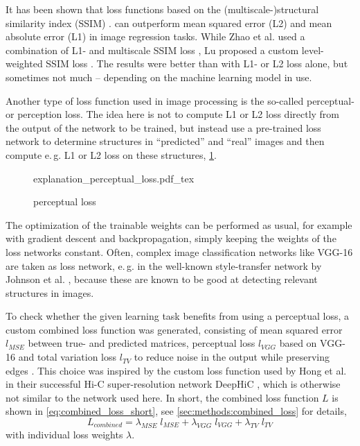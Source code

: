 It has been shown that loss functions based on the (multiscale-)structural similarity index (SSIM) \cite{Wang2003}. 
can outperform mean squared error (L2) and mean absolute error (L1) in image regression tasks.
While Zhao et al. used a combination of L1- and multiscale SSIM loss \cite{Zhao2017},
Lu proposed a custom level-weighted SSIM loss \cite{Lu2019}.
The results were better than with L1- or L2 loss alone, but sometimes not much -- depending on the machine learning model in use.

Another type of loss function used in image processing is the so-called perceptual- or perception loss.
The idea here is not to compute L1 or L2 loss directly from the output of the network to be trained,
but instead use a pre-trained loss network to determine structures in ``predicted'' and ``real'' images
and then compute e.\,g. L1 or L2 loss on these structures, \cref{fig:improve:perceptual_loss}.
\begin{figure}[htb]
    \small
    \centering
    {explanation_perceptual_loss.pdf_tex}%
    \caption{perceptual loss}
    \label{fig:improve:perceptual_loss}
\end{figure}
The optimization of the trainable weights can be performed as usual, for example with gradient descent and backpropagation, 
simply keeping the weights of the loss networks constant.
Often, complex image classification networks like VGG-16 \cite{Simonyan2015} are taken as loss network, e.\,g. in the well-known style-transfer network by Johnson et al. \cite{Johnson2016},
because these are known to be good at detecting relevant structures in images.

To check whether the given learning task benefits from using a perceptual loss, a custom combined loss function was generated,
consisting of mean squared error $l_\mathit{MSE}$ between true- and predicted matrices, perceptual loss $l_\mathit{VGG}$ based on VGG-16 and 
total variation loss $l_\mathit{TV}$ to reduce noise in the output while preserving edges \cite{Rudin1992}. 
This choice was inspired by the custom loss function used by Hong et al. in their successful Hi-C super-resolution network DeepHiC \cite{Hong2020},
which is otherwise not similar to the network used here.
In short, the combined loss function $L$ is shown in \cref{eq:combined_loss_short}, see \cref{sec:methods:combined_loss} for details,
\begin{equation}
 L_\mathit{combined} = \lambda_\mathit{MSE} \; l_\mathit{MSE} + \lambda_\mathit{VGG} \; l_\mathit{VGG} + \lambda_\mathit{TV} \; l_\mathit{TV} \label{eq:combined_loss_short}
\end{equation}
with individual loss weights $\lambda$.

